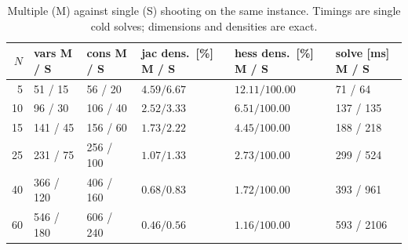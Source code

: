 \begin{table}[htbp]
  \centering
  \small
  \caption{Multiple (M) against single (S) shooting on the same instance. Timings are single cold solves; dimensions and densities are exact.}
  \label{res:tab:shoot}
  \begin{tabular}{rlllll}
    \toprule
    $N$ & vars M / S & cons M / S & jac dens.\ [\%] M / S & hess dens.\ [\%] M / S & solve [ms] M / S \\
    \midrule
    5 & 51 / 15 & 56 / 20 & $4.59 / 6.67$ & $12.11 / 100.00$ & 71 / 64 \\
    10 & 96 / 30 & 106 / 40 & $2.52 / 3.33$ & $6.51 / 100.00$ & 137 / 135 \\
    15 & 141 / 45 & 156 / 60 & $1.73 / 2.22$ & $4.45 / 100.00$ & 188 / 218 \\
    25 & 231 / 75 & 256 / 100 & $1.07 / 1.33$ & $2.73 / 100.00$ & 299 / 524 \\
    40 & 366 / 120 & 406 / 160 & $0.68 / 0.83$ & $1.72 / 100.00$ & 393 / 961 \\
    60 & 546 / 180 & 606 / 240 & $0.46 / 0.56$ & $1.16 / 100.00$ & 593 / 2106 \\
    \bottomrule
  \end{tabular}
\end{table}

